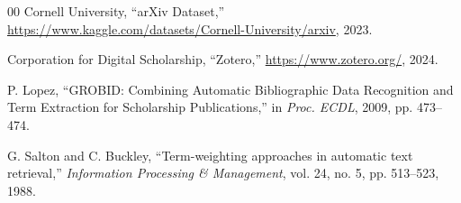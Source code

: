 \documentclass[conference]{IEEEtran}
\begin{document}
\begin{thebibliography}{00}
 Cornell University, ``arXiv Dataset,'' \url{https://www.kaggle.com/datasets/Cornell-University/arxiv}, 2023.

 Corporation for Digital Scholarship, ``Zotero,'' \url{https://www.zotero.org/}, 2024.

 P. Lopez, ``GROBID: Combining Automatic Bibliographic Data Recognition and Term Extraction for Scholarship Publications,'' in \textit{Proc. ECDL}, 2009, pp. 473--474.

 G. Salton and C. Buckley, ``Term-weighting approaches in automatic text retrieval,'' \textit{Information Processing \& Management}, vol. 24, no. 5, pp. 513--523, 1988.

\end{thebibliography}
\end{document}
